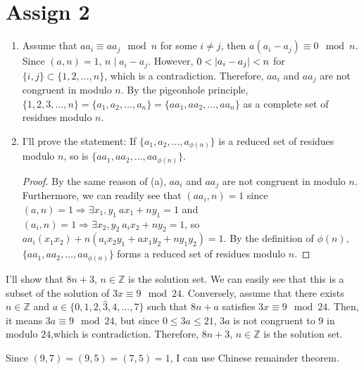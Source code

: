 \documentclass[12pt]{article}
\newenvironment{problem}[2][Problem]{\begin{trivlist}
\item[\hskip \labelsep {\bfseries #1}\hskip \labelsep {\bfseries #2.}]}{\end{trivlist}}
\begin{document}




\section{Assign 2}
\begin{problem}{1}
\end{problem}
\begin{enumerate}

    \item[(a)] Assume that $aa_i\equiv aa_j \mod n$ for some $i\neq j$, then $a(a_i-a_j)\equiv 0 \mod n$. Since $(a,n)=1$, $n\mid a_i-a_j$. However, $0<\abs{a_i-a_j}<n$ for $\{i,j\}\subset \{1, 2, \ldots, n\}$, which is a contradiction. Therefore, $aa_i$ and $aa_j$ are not congruent in modulo $n$. By the pigeonhole principle, $\{1,2,3,\ldots,n\}=\{a_1, a_2,\ldots, a_n\}=\{aa_1, aa_2, \ldots, aa_n\}$ as a complete set of residues modulo $n$.

    \item[(b)] I'll prove the statement: If $\{a_1, a_2, \ldots, a_{\phi(n)}\}$ is a reduced set of residues modulo $n$, so is $\{aa_1, aa_2, \ldots, aa_{\phi(n)}\}$.
    \begin{proof}
    By the same reason of (a), $aa_i$ and $aa_j$ are not congruent in modulo $n$. Furthermore, we can readily see that $(aa_i, n)=1$ since $(a,n)=1\Rightarrow \exists x_1,y_1~ax_1+ny_1=1$ and $(a_i, n)=1\Rightarrow \exists x_2, y_2~a_ix_2+ny_2=1$, so $aa_i(x_1x_2)+n(a_ix_2y_1+ax_1y_2+ny_1y_2)=1$. By the definition of $\phi(n)$, $\{aa_1, aa_2, \ldots, aa_{\phi(n)}\}$ forms a reduced set of residues modulo $n$.
    \end{proof} 
    
\end{enumerate}

\begin{problem}{2}
\end{problem}
I'll show that $8n+3$, $n\in \mathbb{Z}$ is the solution set. We can easily see that this is a subset of the solution of $3x\equiv 9 \mod 24$. Conversely, assume that there exists $n\in \mathbb{Z}$ and $a\in\{0, 1, 2, \hat{3}, 4, \ldots, 7\}$ such that $8n+a$ satisfies $3x\equiv 9 \mod 24$. Then, it means $3a\equiv 9 \mod 24$, but since $0\leq 3a\leq 21$, $3a$ is not congruent to $9$ in modulo $24$,which is contradiction. Therefore, $8n+3$, $n\in \mathbb{Z}$ is the solution set.
\begin{problem}{3}
\end{problem}
Since $(9,7)=(9,5)=(7,5)=1$, I can use Chinese remainder theorem.
\end{document}
